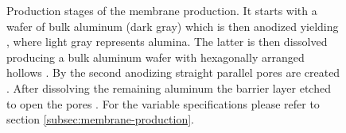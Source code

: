 \documentclass[../../thesis.tex]{subfiles}
\begin{document}
\begin{figure}[ht]
{            \label{fig:al-dissolution-2}}
        \hfill
        \caption{Production stages of the membrane production. It starts with a wafer of bulk aluminum (dark gray) \protect{} which is then anodized yielding \protect{}, where light gray represents alumina. The latter is then dissolved producing a bulk aluminum wafer with hexagonally arranged hollows \protect{}. By the second anodizing straight parallel pores are created \protect{}. After dissolving the remaining aluminum \protect{} the barrier layer etched to open the pores \protect{}. For the variable specifications please refer to section \ref{subsec:membrane-production}.}
        \label{fig:membrane-production}
    \end{figure}
\end{document}
